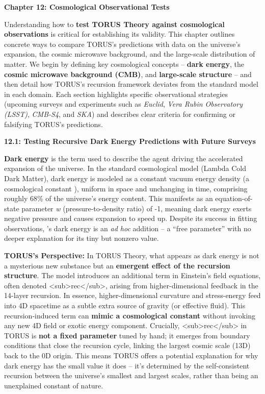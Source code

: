 \documentclass[
]{article}
\begin{document}
\textbf{Chapter 12: Cosmological Observational Tests}

Understanding how to \textbf{test TORUS Theory against cosmological
observations} is critical for establishing its validity. This chapter
outlines concrete ways to compare TORUS's predictions with data on the
universe's expansion, the cosmic microwave background, and the
large-scale distribution of matter. We begin by defining key
cosmological concepts -- \textbf{dark energy}, the \textbf{cosmic
microwave background (CMB)}, and \textbf{large-scale structure} -- and
then detail how TORUS's recursion framework deviates from the standard
\LambdaCDM model in each domain. Each section highlights specific
observational strategies (upcoming surveys and experiments such as
\emph{Euclid}, \emph{Vera Rubin Observatory (LSST)}, \emph{CMB-S4}, and
\emph{SKA}) and describes clear criteria for confirming or falsifying
TORUS's predictions.

\textbf{12.1: Testing Recursive Dark Energy Predictions with Future
Surveys}

\textbf{Dark energy} is the term used to describe the agent driving the
accelerated expansion of the universe. In the standard \textbf{\LambdaCDM}
cosmological model (Lambda Cold Dark Matter), dark energy is modeled as
a constant vacuum energy density (a cosmological constant \textbf{\Lambda}),
uniform in space and unchanging in time, comprising roughly 68\% of the
universe's energy content. This manifests as an equation-of-state
parameter \emph{w} (pressure-to-density ratio) of -1, meaning dark
energy exerts negative pressure and causes expansion to speed up.
Despite its success in fitting observations, \LambdaCDM's dark energy is an
\emph{ad hoc} addition -- a ``free parameter'' with no deeper
explanation for its tiny but nonzero value.

\textbf{TORUS's Perspective:} In TORUS Theory, what appears as dark
energy is not a mysterious new substance but an \textbf{emergent effect
of the recursion structure}. The model introduces an additional term in
Einstein's field equations, often denoted
\emph{\Lambda}\textless sub\textgreater rec\textless/sub\textgreater, arising
from higher-dimensional feedback in the 14-layer recursion\hspace{0pt}.
In essence, higher-dimensional curvature and stress-energy feed into 4D
spacetime as a subtle extra source of gravity (or effective
fluid)\hspace{0pt}. This recursion-induced term can \textbf{mimic a
cosmological constant} without invoking any new 4D field or exotic
energy component\hspace{0pt}. Crucially,
\emph{\Lambda}\textless sub\textgreater rec\textless/sub\textgreater{} in
TORUS is \textbf{not a fixed parameter} tuned by hand; it emerges from
boundary conditions that close the recursion cycle, linking the largest
cosmic scale (13D) back to the 0D origin\hspace{0pt}. This means TORUS
offers a potential explanation for why dark energy has the small value
it does -- it's determined by the self-consistent recursion between the
universe's smallest and largest scales, rather than being an unexplained
constant of nature.
\end{document}

